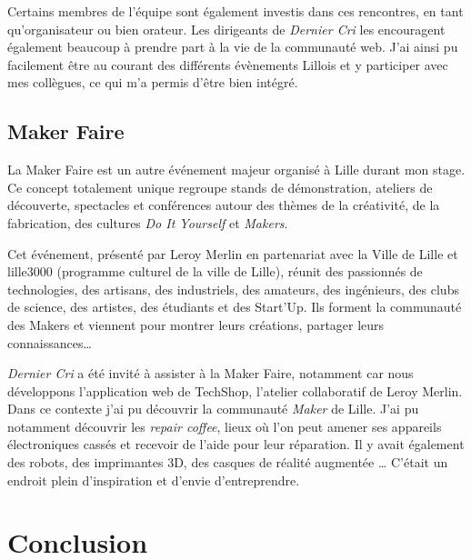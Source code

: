 \bigskip

Certains membres de l'équipe sont également investis dans ces
rencontres, en tant qu'organisateur ou bien orateur. Les dirigeants de
\emph{Dernier Cri} les encouragent également beaucoup à prendre part à
la vie de la communauté web. J'ai ainsi pu facilement être au courant
des différents évènements Lillois et y participer avec mes collègues, ce
qui m'a permis d'être bien intégré.

\bigskip

\subsection{Maker Faire}\label{maker-faire}

\bigskip

La Maker Faire est un autre événement majeur organisé à Lille durant mon
stage. Ce concept totalement unique regroupe stands de démonstration,
ateliers de découverte, spectacles et conférences autour des thèmes de
la créativité, de la fabrication, des cultures \emph{Do It Yourself} et
\emph{Makers}.

\bigskip

Cet événement, présenté par Leroy Merlin en partenariat avec la Ville de
Lille et lille3000 (programme culturel de la ville de Lille), réunit des
passionnés de technologies, des artisans, des industriels, des amateurs,
des ingénieurs, des clubs de science, des artistes, des étudiants et des
Start'Up. Ils forment la communauté des Makers et viennent pour montrer
leurs créations, partager leurs connaissances\ldots{}

\bigskip

\emph{Dernier Cri} a été invité à assister à la Maker Faire, notamment
car nous développons l'application web de TechShop, l'atelier
collaboratif de Leroy Merlin. Dans ce contexte j'ai pu découvrir la
communauté \emph{Maker} de Lille. J'ai pu notamment découvrir les
\emph{repair coffee}, lieux où l'on peut amener ses appareils
électroniques cassés et recevoir de l'aide pour leur réparation. Il y
avait également des robots, des imprimantes 3D, des casques de réalité
augmentée \ldots{} C'était un endroit plein d'inspiration et d'envie
d'entreprendre.

\newpage

\section{Conclusion}\label{conclusion-2}

